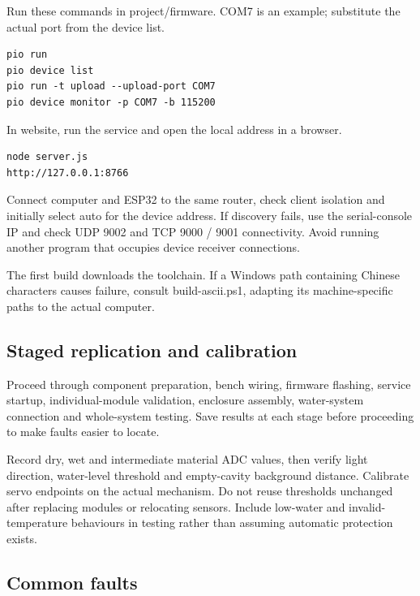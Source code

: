 \documentclass[10pt,a4paper]{article}
\begin{document}
Run these commands in project/firmware. COM7 is an example; substitute the actual port from the device list.


\begingroup\small\begin{verbatim}
pio run
pio device list
pio run -t upload --upload-port COM7
pio device monitor -p COM7 -b 115200
\end{verbatim}\endgroup

In website, run the service and open the local address in a browser.


\begingroup\small\begin{verbatim}
node server.js
http://127.0.0.1:8766
\end{verbatim}\endgroup

Connect computer and ESP32 to the same router, check client isolation and initially select auto for the device address. If discovery fails, use the serial-console IP and check UDP 9002 and TCP 9000 / 9001 connectivity. Avoid running another program that occupies device receiver connections.


The first build downloads the toolchain. If a Windows path containing Chinese characters causes failure, consult build-ascii.ps1, adapting its machine-specific paths to the actual computer.




\subsection{Staged replication and calibration}

Proceed through component preparation, bench wiring, firmware flashing, service startup, individual-module validation, enclosure assembly, water-system connection and whole-system testing. Save results at each stage before proceeding to make faults easier to locate.


Record dry, wet and intermediate material ADC values, then verify light direction, water-level threshold and empty-cavity background distance. Calibrate servo endpoints on the actual mechanism. Do not reuse thresholds unchanged after replacing modules or relocating sensors. Include low-water and invalid-temperature behaviours in testing rather than assuming automatic protection exists.


\subsection{Common faults}
\end{document}
